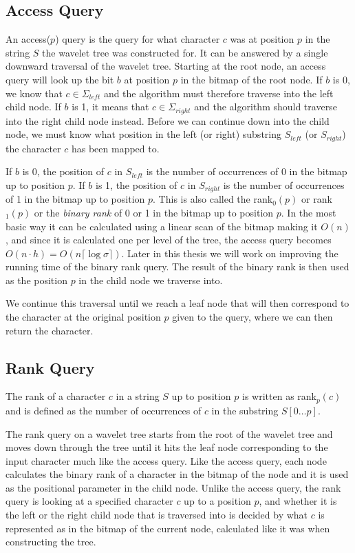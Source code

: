 \subsection{Access Query}
An access($p$) query is the query for what character $c$ was at position $p$ in the string $S$ the wavelet tree was constructed for.
It can be answered by a single downward traversal of the wavelet tree.
Starting at the root node, an access query will look up the bit $b$ at position $p$ in the bitmap of the root node.
If $b$ is 0, we know that $c \in \Sigma_{left}$ and the algorithm must therefore traverse into the left child node.
If $b$ is 1, it means that $c \in \Sigma_{right}$ and the algorithm should traverse into the right child node instead.
Before we can continue down into the child node, we must know what position in the left (or right) substring $S_{left}$ (or $S_{right}$) the character $c$ has been mapped to.

If $b$ is 0, the position of $c$ in $S_{left}$ is the number of occurrences of 0 in the bitmap up to position $p$.
If $b$ is 1, the position of $c$ in $S_{right}$ is the number of occurrences of 1 in the bitmap up to position $p$.
This is also called the rank$_0(p)$ or rank$_1(p)$ or the \textit{binary rank} of 0 or 1 in the bitmap up to position $p$.
In the most basic way it can be calculated using a linear scan of the bitmap making it $O(n)$, and since it is calculated one per level of the tree, the access query becomes $O(n \cdot h) = O(n \lceil \log \sigma \rceil)$.
Later in this thesis we will work on improving the running time of the binary rank query.
The result of the binary rank is then used as the position $p$ in the child node we traverse into.

We continue this traversal until we reach a leaf node that will then correspond to the character at the original position $p$ given to the query, where we can then return the character.

\subsection{Rank Query}
\label{sec:rankDescription}
The rank of a character $c$ in a string $S$ up to position $p$ is written as rank$_{p}(c)$ and is defined as the number of occurrences of $c$ in the substring $S[0 \ldots p]$.

The rank query on a wavelet tree starts from the root of the wavelet tree and moves down through the tree until it hits the leaf node corresponding to the input character much like the access query.
Like the access query, each node calculates the binary rank of a character in the bitmap of the node and it is used as the positional parameter in the child node.
Unlike the access query, the rank query is looking at a specified character $c$ up to a position $p$, and whether it is the left or the right child node that is traversed into is decided by what $c$ is represented as in the bitmap of the current node, calculated like it was when constructing the tree.


